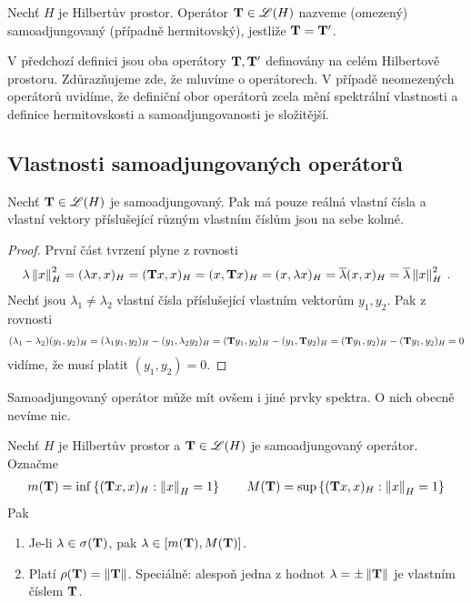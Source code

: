 \begin{definition}
Nechť $H$ je Hilbertův prostor. Operátor $\mathbf{T} \in \mathscr{L}(H)$ nazveme (omezený) samoadjungovaný  (případně hermitovský), jestliže $\mathbf{T} = \mathbf{T}'$.
\end{definition}
\begin{remark}
V předchozí definici jsou oba operátory $\mathbf{T}, \mathbf{T}'$ definovány na celém Hilbertově prostoru. Zdůrazňujeme zde, že mluvíme o  operátorech. V případě neomezených operátorů uvidíme, že definiční obor operátorů zcela mění spektrální vlastnosti a definice hermitovskosti a samoadjungovanosti je složitější.
\end{remark}

\subsection{Vlastnosti samoadjungovaných operátorů}

\begin{lemma}
Nechť $\mathbf{T} \in \mathscr{L} (H)$ je samoadjungovaný. Pak má pouze reálná vlastní čísla a vlastní vektory příslušející různým vlastním číslům jsou na sebe kolmé.
\end{lemma}
\begin{proof}
První část tvrzení plyne z rovnosti \begin{align*}
\lambda \left\lVert x\right\rVert^2_H = (\lambda x, x)_H = (\mathbf{T} x,x)_H = (x, \mathbf{T} x)_H = (x, \lambda x)_H = \overline{\lambda} (x,x)_H = \overline{\lambda} \left\lVert x\right\rVert_H ^2 \:.
\end{align*}
Nechť jsou $\lambda_1 \neq \lambda_2$ vlastní čísla příslušející vlastním vektorům $y_1,y_2$. Pak z rovnosti \begin{align*}
    (\lambda_1 - \lambda_2)(y_1,y_2)_H = (\lambda_1 y_1,y_2)_H - (y_1, \lambda_2 y_2)_H = (\mathbf{T} y_1, y_2)_H - (y_1, \mathbf{T} y_2)_H = (\mathbf{T} y_1,y_2)_H - (\mathbf{T} y_1,y_2)_H = 0
\end{align*}
vidíme, že musí platit $(y_1,y_2)=0$.
\end{proof}
\begin{remark}
Samoadjungovaný operátor může mít ovšem i jiné prvky spektra. O nich obecně nevíme nic.
\end{remark}
\begin{theorem}
Nechť $H$ je Hilbertův prostor a $\mathbf{T} \in \mathscr{L} (H)$ je samoadjungovaný operátor. Označme \begin{align*}
    m(\mathbf{T}) = \inf \left \lbrace (\mathbf{T} x,x)_H : \left\lVert x\right\rVert_H = 1 \right \rbrace \qquad M(\mathbf{T}) = \sup \left \lbrace (\mathbf{T} x,x)_H : \left\lVert x\right\rVert_H = 1 \right \rbrace
\end{align*} Pak \begin{enumerate}
    \item Je-li $\lambda \in \sigma(\mathbf{T})$, pak $\lambda \in [m(\mathbf{T}), M(\mathbf{T})]$.
    \item Platí $\rho(\mathbf{T}) = \left\lVert\mathbf{T}\right\rVert$. Speciálně: alespoň jedna z hodnot $\lambda = \pm \left\lVert\mathbf{T}\right\rVert$ je vlastním číslem $\mathbf{T}$.
\end{enumerate}
\end{theorem}

